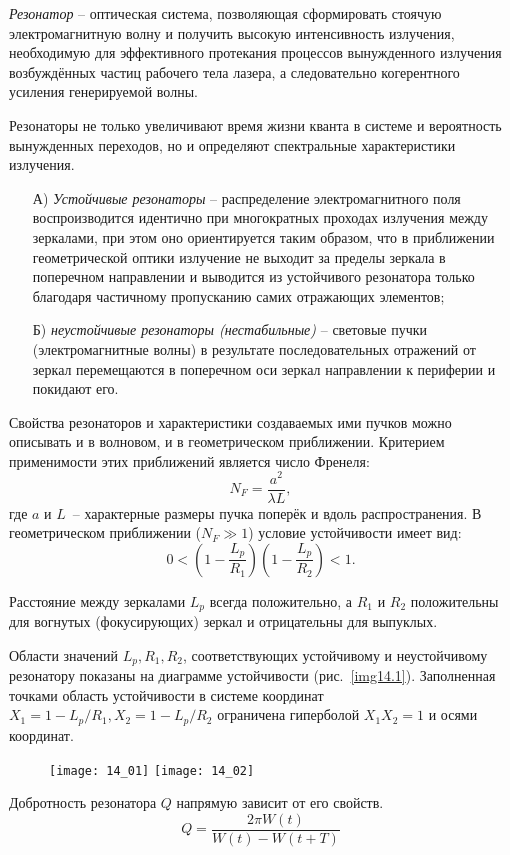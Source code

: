 
\emph{Резонатор} -- оптическая система, позволяющая сформировать стоячую
электромагнитную волну и получить высокую интенсивность излучения,
необходимую для эффективного протекания процессов вынужденного излучения
возбуждённых частиц рабочего тела лазера, а следовательно когерентного
усиления генерируемой волны.

Резонаторы не только увеличивают время жизни кванта в системе и вероятность
вынужденных переходов, но и определяют спектральные характеристики излучения.
\begin{enumerate}
    \item[А)] \emph{Устойчивые резонаторы} -- распределение электромагнитного поля
воспроизводится идентично при многократных проходах излучения между зеркалами,
при этом оно ориентируется таким образом, что в приближении геометрической
оптики излучение не выходит за пределы зеркала в поперечном направлении и
выводится из устойчивого резонатора только благодаря частичному пропусканию
самих отражающих элементов;
    \item[Б)] \emph{неустойчивые резонаторы (нестабильные)} -- световые пучки
(электромагнитные волны) в результате последовательных отражений от зеркал
перемещаются в поперечном оси зеркал направлении к периферии и покидают его.
\end{enumerate}
Свойства резонаторов и характеристики создаваемых ими пучков можно описывать
и в волновом, и в геометрическом приближении. Критерием применимости этих
приближений является число Френеля:
\[
    N_F = \frac{a^2}{\lambda L},
\]
где \( a \) и \( L \)~-- характерные размеры пучка поперёк и вдоль
распространения. В геометрическом приближении (\( N_F \gg 1 \)) условие
устойчивости имеет вид:
\[
    0 < \left(1-\frac{L_p}{R_1}\right)\left(1-\frac{L_p}{R_2}\right) < 1.
\]

Расстояние между зеркалами \( L_p \) всегда положительно, а \( R_1 \) и
\( R_2 \) положительны для вогнутых (фокусирующих) зеркал и отрицательны для
выпуклых.

Области значений \( L_p, R_1, R_2 \), соответствующих устойчивому и
неустойчивому резонатору показаны на диаграмме устойчивости
(рис.~\ref{img14.1}). Заполненная точками область устойчивости в системе
координат \( X_1 = 1 - L_p / R_1, X_2 = 1 - L_p / R_2 \) ограничена гиперболой
\( X_1 X_2 = 1 \) и осями координат.
\begin{figure}[h!]
    \center
    \texttt{[image: 14\_01]} \hspace{1em}
    \texttt{[image: 14\_02]} \\
    \parbox{.4\textwidth}{\caption{} \label{img14.1}} \hspace{1em}
    \parbox{.4\textwidth}{\caption{} \label{img14.2}}
\end{figure}

Добротность резонатора \( Q \) напрямую зависит от его свойств.
\[
    Q = \frac{2\pi W(t)}{W(t)-W(t+T)}
\]
